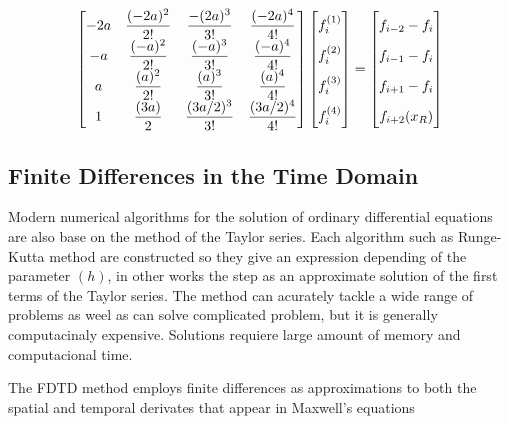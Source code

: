 \begin{align}
\begin{bmatrix}
    -2a & \dfrac{(-2a)^2}{2!} & \dfrac{-(2a)^3}{3!} & \dfrac{(-2a)^4}{4!}\\
    -a & \dfrac{(-a)^2}{2!} & \dfrac{(-a)^3}{3!} & \dfrac{(-a)^4}{4!}\\
    a & \dfrac{(a)^2}{2!} & \dfrac{(a)^3}{3!} & \dfrac{(a)^4}{4!}\\
    1 & \dfrac{(3a)}{2} & \dfrac{(3a/2)^3}{3!} & \dfrac{(3a/2)^4}{4!}
\end{bmatrix}
\begin{bmatrix}
    f_i^{(1)}  \vphantom{ \dfrac{d^4}{d} }\\
    f_i^{(2)}  \vphantom{ \dfrac{d^4}{d} } \\
    f_i^{(3)}  \vphantom{ \dfrac{d^4}{d} } \\
    f_i^{(4)}  \vphantom{ \dfrac{d^4}{d} }
\end{bmatrix}
=
\begin{bmatrix}
    f_{i-2} - f_{i}    \vphantom{ \dfrac{d^4}{d}} \\
    f_{i-1} - f_{i}    \vphantom{ \dfrac{d^4}{d}} \\
    f_{i+1} - f_{i}    \vphantom{ \dfrac{d^4}{d}} \\
    f_{i+2}(x_R)   \vphantom{ \dfrac{d^4}{d}}
\end{bmatrix}
\end{align}


\cite{methods}

\subsection{Finite Differences in the Time Domain}

Modern numerical algorithms for the solution of ordinary differential equations are also base on the method of the Taylor series. Each algorithm such as Runge-Kutta method are constructed so they give an expression depending of the parameter $(h)$, in other works the step as an approximate solution of the first terms of the Taylor series. \cite{ufdtd}
The method can acurately tackle a wide range of problems as weel as can solve complicated problem, but it is generally computacinaly expensive. Solutions requiere large amount of memory and computacional time. 

The FDTD method employs finite differences as approximations to both the spatial and temporal derivates that appear in Maxwell's equations


